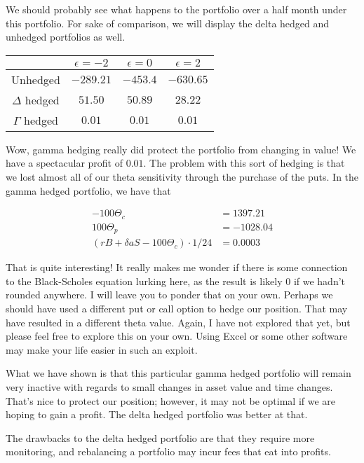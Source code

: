 \documentclass{ximera}
\begin{document}
We should probably see what happens to the portfolio over a half month under this portfolio. For sake of comparison, we will display the delta hedged and unhedged portfolios as well.

\begin{center}
	\begin{tabular}{c|ccc}
				& $\epsilon=-2$ 	& $\epsilon=0$ 	& $\epsilon=2$\\
	\hline
	Unhedged 		& $-289.21$ 		& $-453.4$ 		& $-630.65$\\
	$\Delta$ hedged 	& $51.50$ 		& $50.89$ 		& $28.22$\\
	$\Gamma$ hedged 	& $0.01$ 		& $0.01$ 		& $0.01$
	\end{tabular}
\end{center}

Wow, gamma hedging really did protect the portfolio from changing in value! We have a spectacular profit of $0.01$. The problem with this sort of hedging is that we lost almost all of our theta sensitivity through the purchase of the puts. In the gamma hedged portfolio, we have that

\begin{align*}
-100\Theta_c 						&=1397.21\\
100\Theta_p							&=-1028.04\\ 
(rB+\delta aS-100\Theta_c)\cdot 1/24 			&=0.0003
\end{align*}

That is quite interesting! It really makes me wonder if there is some connection to the Black-Scholes equation lurking here, as the result is likely $0$ if we hadn't rounded anywhere. I will leave you to ponder that on your own. Perhaps we should have used a different put or call option to hedge our position. That may have resulted in a different theta value. Again, I have not explored that yet, but please feel free to explore this on your own. Using Excel or some other software may make your life easier in such an exploit.

What we have shown is that this particular gamma hedged portfolio will remain very inactive with regards to small changes in asset value and time changes. That's nice to protect our position; however, it may not be optimal if we are hoping to gain a profit. The delta hedged portfolio was better at that.

The drawbacks to the delta hedged portfolio are that they require more monitoring, and rebalancing a portfolio may incur fees that eat into profits. 
\end{document}
